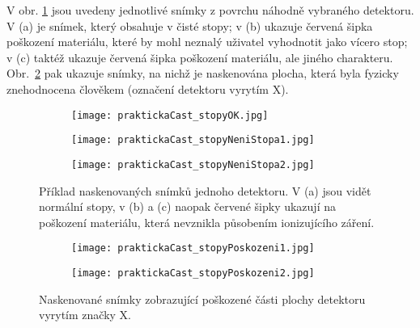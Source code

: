 V obr. \ref{fig:praktickaCast_stopy} jsou uvedeny jednotlivé snímky z povrchu náhodně vybraného detektoru. V (a) je snímek, který obsahuje v čisté stopy; v (b) ukazuje červená šipka poškození materiálu, které by mohl neznalý uživatel vyhodnotit jako vícero stop; v (c) taktéž ukazuje červená šipka poškození materiálu, ale jiného charakteru. Obr.~\ref{fig:praktickaCast_stopyPoskozeni} pak ukazuje snímky, na nichž je naskenována plocha, která byla fyzicky znehodnocena člověkem (označení detektoru vyrytím X). 
\begin{figure}[h]
  \centering
  \begin{subfigure}{0.7\textwidth}
	\texttt{[image: praktickaCast\_stopyOK.jpg]}
	\caption{}
  \end{subfigure}
  \begin{subfigure}{0.7\textwidth}
	\texttt{[image: praktickaCast\_stopyNeniStopa1.jpg]}
	\caption{}
  \end{subfigure}
  \begin{subfigure}{0.7\textwidth}
	\texttt{[image: praktickaCast\_stopyNeniStopa2.jpg]}
	\caption{}
  \end{subfigure}
  \caption{Příklad naskenovaných snímků jednoho detektoru. V (a) jsou vidět normální stopy, v (b) a (c) naopak červené šipky ukazují na poškození materiálu, která nevznikla působením ionizujícího záření.}
  \label{fig:praktickaCast_stopy}
\end{figure}
\begin{figure}[h]
  \centering
  \begin{subfigure}{0.7\textwidth}
	\texttt{[image: praktickaCast\_stopyPoskozeni1.jpg]}
	\caption{}
  \end{subfigure}
  \begin{subfigure}{0.7\textwidth}
	\texttt{[image: praktickaCast\_stopyPoskozeni2.jpg]}
	\caption{}
  \end{subfigure}
  \caption{Naskenované snímky zobrazující poškozené části plochy detektoru vyrytím značky X.}
  \label{fig:praktickaCast_stopyPoskozeni}
\end{figure}

